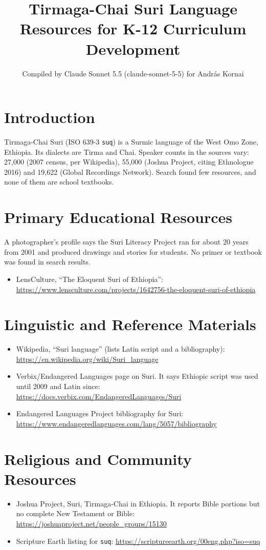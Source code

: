 \documentclass[12pt]{article}
\title{Tirmaga-Chai Suri Language Resources for K-12 Curriculum Development}
\author{Compiled by Claude Sonnet 5.5 (claude-sonnet-5-5) for Andr\'as Kornai}
\date{}
\begin{document}
\maketitle

\section{Introduction}
Tirmaga-Chai Suri (ISO 639-3 \texttt{suq}) is a Surmic language of the West Omo Zone, Ethiopia. Its dialects are Tirma and Chai. Speaker counts in the sources vary: 27,000 (2007 census, per Wikipedia), 55,000 (Joshua Project, citing Ethnologue 2016) and 19,622 (Global Recordings Network). Search found few resources, and none of them are school textbooks.

\section{Primary Educational Resources}
A photographer's profile says the Suri Literacy Project ran for about 20 years from 2001 and produced drawings and stories for students. No primer or textbook was found in search results.
\begin{itemize}
\item LensCulture, ``The Eloquent Suri of Ethiopia'': \url{https://www.lensculture.com/projects/1642756-the-eloquent-suri-of-ethiopia}
\end{itemize}

\section{Linguistic and Reference Materials}
\begin{itemize}
\item Wikipedia, ``Suri language'' (lists Latin script and a bibliography): \url{https://en.wikipedia.org/wiki/Suri_language}
\item Verbix/Endangered Languages page on Suri. It says Ethiopic script was used until 2009 and Latin since: \url{https://docs.verbix.com/EndangeredLanguages/Suri}
\item Endangered Languages Project bibliography for Suri: \url{https://www.endangeredlanguages.com/lang/5057/bibliography}
\end{itemize}

\section{Religious and Community Resources}
\begin{itemize}
\item Joshua Project, Suri, Tirmaga-Chai in Ethiopia. It reports Bible portions but no complete New Testament or Bible: \url{https://joshuaproject.net/people_groups/15130}
\item Scripture Earth listing for \texttt{suq}: \url{https://scriptureearth.org/00eng.php?iso=suq}
\end{itemize}
\end{document}

